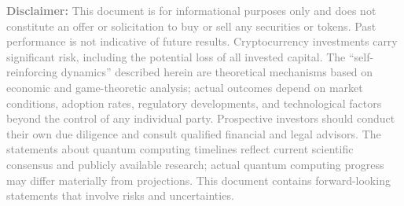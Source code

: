 \documentclass[11pt,a4paper]{article}
\begin{document}
\vspace{1cm}
\begin{center}
\begin{minipage}{13cm}
{\scriptsize\textcolor{gray}{
\textbf{Disclaimer:} This document is for informational purposes only and does not constitute an offer or solicitation to buy or sell any securities or tokens. Past performance is not indicative of future results. Cryptocurrency investments carry significant risk, including the potential loss of all invested capital. The ``self-reinforcing dynamics'' described herein are theoretical mechanisms based on economic and game-theoretic analysis; actual outcomes depend on market conditions, adoption rates, regulatory developments, and technological factors beyond the control of any individual party. Prospective investors should conduct their own due diligence and consult qualified financial and legal advisors. The statements about quantum computing timelines reflect current scientific consensus and publicly available research; actual quantum computing progress may differ materially from projections. This document contains forward-looking statements that involve risks and uncertainties.
}}
\end{minipage}
\end{center}
\end{document}
